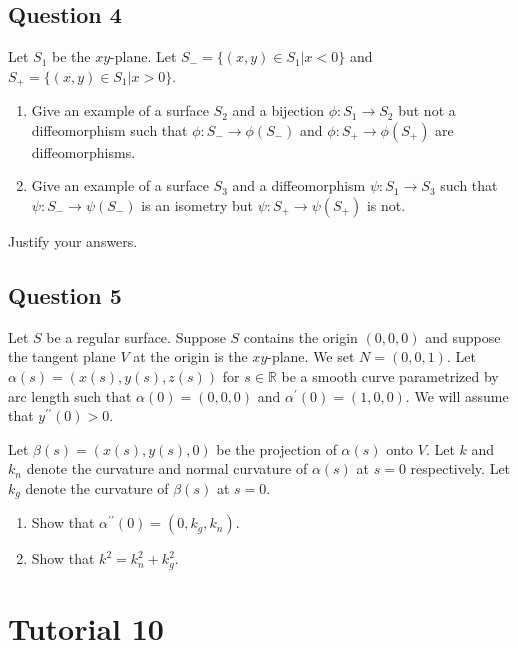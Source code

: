 \documentclass[12pt, a4paper]{article}
\newcommand{\R}{\mathbb{R}}
\begin{document}
\subsection*{Question 4}
Let $S_{1}$ be the $xy$-plane. Let $S_{-}=\{(x,y)\in S_{1}|x<0\}$ and $S_{+}=\{(x,y)\in S_{1}|x>0\}$.
\begin{enumerate}[label=(\roman*)]
    \item Give an example of a surface $S_{2}$ and a bijection $\phi:S_{1}\rightarrow S_{2}$ but not a diffeomorphism such that $\phi:S_{-}\rightarrow\phi(S_{-})$ and $\phi:S_{+}\rightarrow\phi(S_{+})$ are diffeomorphisms.
    \item Give an example of a surface $S_{3}$ and a diffeomorphism $\psi:S_{1}\rightarrow S_{3}$ such that $\psi:S_{-}\rightarrow\psi(S_{-})$ is an isometry but $\psi:S_{+}\rightarrow\psi(S_{+})$ is not.
\end{enumerate}
Justify your answers.
\newpage

\subsection*{Question 5}
Let $S$ be a regular surface. Suppose $S$ contains the origin $(0,0,0)$ and suppose the tangent plane $V$ at the origin is the $xy$-plane. We set $N=(0,0,1)$. Let $\alpha(s)=(x(s),y(s),z(s))$ for $s\in\R$ be a smooth curve parametrized by arc length such that $\alpha(0)=(0,0,0)$ and $\alpha^{\prime}(0)=(1,0,0)$. We will assume that $y^{\prime\prime}(0)>0$.

Let $\beta(s)=(x(s),y(s),0)$ be the projection of $\alpha(s)$ onto $V$. Let $k$ and $k_{n}$ denote the curvature and normal curvature of $\alpha(s)$ at $s=0$ respectively. Let $k_{g}$ denote the curvature of $\beta(s)$ at $s=0$.
\begin{enumerate}[label=(\roman*)]
    \item Show that $\alpha^{\prime\prime}(0)=(0,k_{g},k_{n})$.
    \item Show that $k^{2}=k_{n}^{2}+k_{g}^{2}$.
\end{enumerate}
\newpage

\section*{Tutorial 10}
\end{document}
